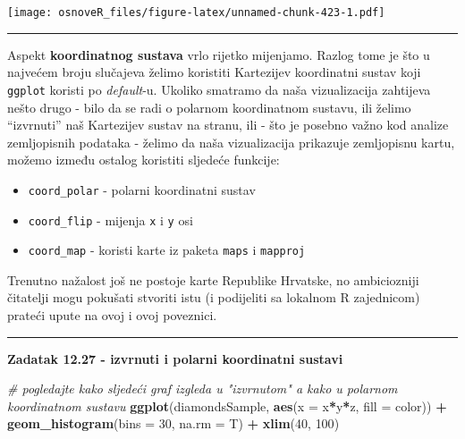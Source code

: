 \documentclass[]{book}
\newenvironment{Shaded}{\begin{snugshade}}{\end{snugshade}}
\newcommand{\KeywordTok}[1]{\textcolor[rgb]{0.13,0.29,0.53}{\textbf{#1}}}
\newcommand{\DataTypeTok}[1]{\textcolor[rgb]{0.13,0.29,0.53}{#1}}
\newcommand{\DecValTok}[1]{\textcolor[rgb]{0.00,0.00,0.81}{#1}}
\newcommand{\StringTok}[1]{\textcolor[rgb]{0.31,0.60,0.02}{#1}}
\newcommand{\CommentTok}[1]{\textcolor[rgb]{0.56,0.35,0.01}{\textit{#1}}}
\newcommand{\OperatorTok}[1]{\textcolor[rgb]{0.81,0.36,0.00}{\textbf{#1}}}
\newcommand{\NormalTok}[1]{#1}
\providecommand{\tightlist}{%
  \setlength{\itemsep}{0pt}\setlength{\parskip}{0pt}}
\theoremstyle{definition}
\theoremstyle{definition}
\theoremstyle{definition}
\theoremstyle{remark}
\begin{document}
\texttt{[image: osnoveR\_files/figure-latex/unnamed-chunk-423-1.pdf]}

\begin{center}\rule{0.5\linewidth}{\linethickness}\end{center}

Aspekt \textbf{koordinatnog sustava} vrlo rijetko mijenjamo. Razlog tome
je što u najvećem broju slučajeva želimo koristiti Kartezijev
koordinatni sustav koji \texttt{ggplot} koristi po \emph{default}-u.
Ukoliko smatramo da naša vizualizacija zahtijeva nešto drugo - bilo da
se radi o polarnom koordinatnom sustavu, ili želimo ``izvrnuti'' naš
Kartezijev sustav na stranu, ili - što je posebno važno kod analize
zemljopisnih podataka - želimo da naša vizualizacija prikazuje
zemljopisnu kartu, možemo između ostalog koristiti sljedeće funkcije:

\begin{itemize}
\tightlist
\item
  \texttt{coord\_polar} - polarni koordinatni sustav
\item
  \texttt{coord\_flip} - mijenja \texttt{x} i \texttt{y} osi
\item
  \texttt{coord\_map} - koristi karte iz paketa \texttt{maps} i
  \texttt{mapproj}
\end{itemize}

Trenutno nažalost još ne postoje karte Republike Hrvatske, no
ambiciozniji čitatelji mogu pokušati stvoriti istu (i podijeliti sa
lokalnom R zajednicom) prateći upute na ovoj i ovoj poveznici.

\begin{center}\rule{0.5\linewidth}{\linethickness}\end{center}

\textbf{Zadatak 12.27 - izvrnuti i polarni koordinatni sustavi}

\begin{Shaded}
\begin{Highlighting}[]
\CommentTok{# pogledajte kako sljedeći graf izgleda u "izvrnutom" a kako u polarnom koordinatnom sustavu}
\KeywordTok{ggplot}\NormalTok{(diamondsSample, }\KeywordTok{aes}\NormalTok{(}\DataTypeTok{x =}\NormalTok{ x}\OperatorTok{*}\NormalTok{y}\OperatorTok{*}\NormalTok{z, }\DataTypeTok{fill =}\NormalTok{ color)) }\OperatorTok{+}\StringTok{ }\KeywordTok{geom_histogram}\NormalTok{(}\DataTypeTok{bins =} \DecValTok{30}\NormalTok{, }\DataTypeTok{na.rm =}\NormalTok{ T) }\OperatorTok{+}\StringTok{ }
\StringTok{  }\KeywordTok{xlim}\NormalTok{(}\DecValTok{40}\NormalTok{, }\DecValTok{100}\NormalTok{) }
\end{Highlighting}
\end{Shaded}
\end{document}
